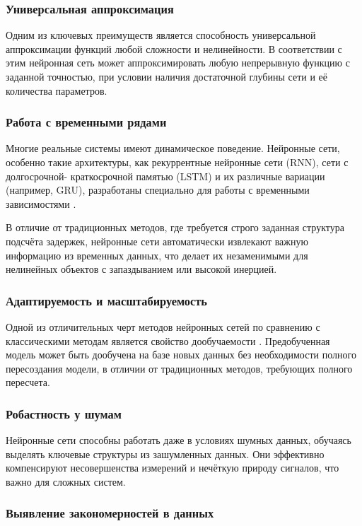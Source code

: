 \subsubsection{Универсальная аппроксимация}
Одним из ключевых преимуществ является способность универсальной аппроксимации
функций любой сложности и нелинейности. В соответствии с этим нейронная сеть
может аппроксимировать любую непрерывную функцию с заданной точностью, при
условии наличия достаточной глубины сети и её количества параметров.

\subsubsection{Работа с временными рядами}

Многие реальные системы имеют динамическое поведение. Нейронные сети, особенно
такие архитектуры, как рекуррентные нейронные сети (RNN), сети с долгосрочной-
краткосрочной памятью (LSTM) и их различные вариации (например, GRU), разработаны
специально для работы с временными зависимостями \cite{bib:ident:neural:fundumentals}.

В отличие от традиционных методов, где требуется строго заданная структура
подсчёта задержек, нейронные сети автоматически извлекают важную информацию из
временных данных, что делает их незаменимыми для нелинейных объектов с
запаздыванием или высокой инерцией.

\subsubsection{Адаптируемость и масштабируемость}

Одной из отличительных черт методов нейронных сетей по сравнению с
классическими методам является свойство дообучаемости \cite{bib:ident:modelling:complex}. 
Предобученная модель может быть дообучена на базе новых данных без необходимости полного
пересоздания модели, в отличии от традиционных методов, требующих полного
пересчета.

\subsubsection{Робастность у шумам}

Нейронные сети способны работать даже в условиях шумных данных, обучаясь
выделять ключевые структуры из зашумленных данных. Они эффективно компенсируют
несовершенства измерений и нечёткую природу сигналов, что важно для сложных
систем.

\subsubsection{Выявление закономерностей в данных}

